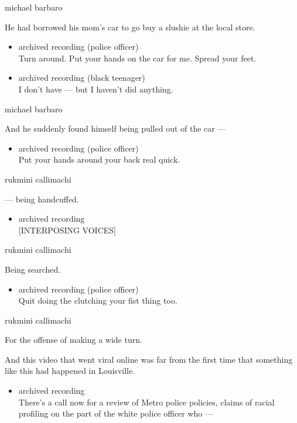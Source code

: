 michael barbaro

He had borrowed his mom's car to go buy a slushie at the local store.

\begin{itemize}
\item
  archived recording (police officer)\\
  Turn around. Put your hands on the car for me. Spread your feet.
\item
  archived recording (black teenager)\\
  I don't have --- but I haven't did anything.
\end{itemize}

michael barbaro

And he suddenly found himself being pulled out of the car ---

\begin{itemize}
\tightlist
\item
  archived recording (police officer)\\
  Put your hands around your back real quick.
\end{itemize}

rukmini callimachi

--- being handcuffed.

\begin{itemize}
\tightlist
\item
  archived recording\\
  {[}INTERPOSING VOICES{]}
\end{itemize}

rukmini callimachi

Being searched.

\begin{itemize}
\tightlist
\item
  archived recording (police officer)\\
  Quit doing the clutching your fist thing too.
\end{itemize}

rukmini callimachi

For the offense of making a wide turn.

And this video that went viral online was far from the first time that
something like this had happened in Louisville.

\begin{itemize}
\tightlist
\item
  archived recording\\
  There's a call now for a review of Metro police policies, claims of
  racial profiling on the part of the white police officer who ---
\end{itemize}

